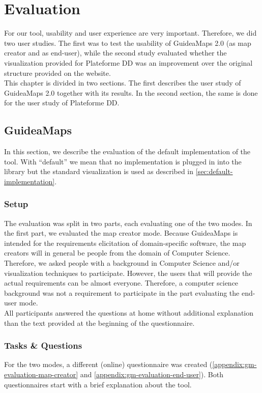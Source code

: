 \chapter{Evaluation}\label{ch:evaluation}
For our tool, usability and user experience are very important. Therefore, we did two user studies. The first was to test the usability of GuideaMaps 2.0 (as map creator and as end-user), while the second study evaluated whether the visualization provided for Plateforme DD was an improvement over the original structure provided on the website.\\

This chapter is divided in two sections. The first describes the user study of GuideaMaps 2.0 together with its results. In the second section, the same is done for the user study of Plateforme DD.





\section{GuideaMaps}
In this section, we describe the evaluation of the default implementation of the tool. With ``default'' we mean that no implementation is plugged in into the library but the standard visualization is used as described in \autoref{sec:default-implementation}.

\subsection{Setup}
The evaluation was split in two parts, each evaluating one of the two modes. In the first part, we evaluated the map creator mode. Because GuideaMaps is intended for the requirements elicitation of domain-specific software, the map creators will in general be people from the domain of Computer Science. Therefore, we asked people with a background in Computer Science and/or visualization techniques to participate. However, the users that will provide the actual requirements can be almost everyone. Therefore, a computer science background was not a requirement to participate in the part evaluating the end-user mode.\\

All participants answered the questions at home without additional explanation than the text provided at the beginning of the questionnaire.

\subsection{Tasks \& Questions}
For the two modes, a different (online) questionnaire was created (\autoref{appendix:gm-evaluation-map-creator} and \autoref{appendix:gm-evaluation-end-user}). Both questionnaires start with a brief explanation about the tool.\\

